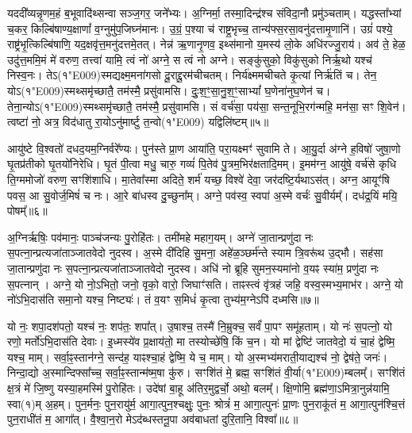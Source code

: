 यददी᳚व्यन्नृ॒णम॒हं ब॒भूवादि॑थ्सन्वा सञ्ज॒गर॒ जने᳚भ्यः। 
अ॒ग्निर्मा॒ तस्मा॒दिन्द्र॑श्च संविदा॒नौ प्रमु॑ञ्चताम्। 
यद्धस्ता᳚भ्यां च॒कर॒ किल्बि॑षाण्य॒क्षाणां᳚ व॒ग्नुमु॑प॒जिघ्न॑मानः। 
उ॒ग्रं॒ प॒श्या च॑ राष्ट्र॒भृच्च॒ तान्य॑फ्स॒रसा॒वनु॑दत्तामृ॒णानि॑। 
उग्रं॑ पश्ये॒ राष्ट्र॑भृ॒त्किल्बि॑षाणि॒ यद॒क्षवृ॑त्त॒मनु॑दत्तमे॒तत्। 
नेन्न॑ ऋ॒णानृ॒णव॒ इथ्स॑मानो य॒मस्य॑ लो॒के अधि॑रज्जु॒राय॑। 
अव॑ ते॒ हेळ॒ उदु॑त्त॒ममि॒मं मे॑ वरुण॒ तत्त्वा॑ यामि॒ त्वं नो॑ अग्ने॒ स त्वं नो अग्ने। 
सङ्कु॑सुको॒ विकु॑सुको निर्\mbox{}ऋ॒थो यश्च॑ निस्व॒नः। 
तेऽ(१\char"E009)स्मद्यक्ष्म॒मना॑गसो दू॒राद्दू॒रम॑चीचतम्। 
निर्य॑क्ष्ममचीचते कृ॒त्यां निर्\mbox{}ऋ॑तिं च। 
तेन॒ योऽ(१\char"E009)स्मथ्समृ॑च्छातै॒ तम॑स्मै॒ प्रसु॑वामसि। 
दुः॒श॒ꣳ॒सा॒नु॒श॒ꣳ॒साभ्यां᳚ घ॒णेना॑नुघ॒णेन॑ च। 
तेना॒न्योऽ(१\char"E009)स्मथ्समृ॑च्छातै॒ तम॑स्मै॒ प्रसु॑वामसि। 
सं वर्च॑सा॒ पय॑सा॒ सन्त॒नूभि॒रग॑न्महि॒ मन॑सा॒ सꣳ शि॒वेन॑। 
त्वष्टा॑ नो॒ अत्र॒ विद॑धातु रा॒योऽनु॑मार्ष्टु त॒न्वो(१\char"E009) यद्विलि॑ष्टम्॥५॥\anuvakamend


आयु॑ष्टे वि॒श्वतो॑ दधद॒यम॒ग्निर्वरे᳚ण्यः। 
पुन॑स्ते प्रा॒ण आया॑ति॒ परा॒यक्ष्मꣳ॑ सुवामि ते। 
आ॒यु॒र्दा अ॑ग्ने ह॒विषो॑ जुषा॒णो घृ॒तप्र॑तीको घृ॒तयो॑निरेधि। 
घृ॒तं पी॒त्वा मधु॒ चारु॒ गव्यं॑ पि॒तेव॑ पु॒त्रम॒भिर॑क्षतादि॒मम्। 
इ॒मम॑ग्न॒ आयु॑षे॒ वर्च॑से कृधि ति॒ग्ममोजो॑ वरुण॒ सꣳशि॑शाधि। 
मा॒तेवा᳚स्मा अदिते॒ शर्म॑ यच्छ॒ विश्वे॑ देवा॒ जर॑दष्टि॒र्यथाऽस॑त्। 
अग्न॒ आयूꣳ॑षि पवस॒ आ सु॒वोर्ज॒मिषं॑ च नः। 
आ॒रे बा॑धस्व दु॒च्छुना᳚म्। 
अग्ने॒ पव॑स्व॒ स्वपा॑ अ॒स्मे वर्चः॑ सु॒वीर्यम्᳚। 
दध॑द्र॒यिं मयि॒ पोषम्᳚॥६॥

अ॒ग्निर्\mbox{}ऋषिः॒ पव॑मानः॒ पाञ्च॑जन्यः पु॒रोहि॑तः। 
तमी॑महे महाग॒यम्। 
अग्ने॑ जा॒तान्प्रणु॑दा नः स॒पत्ना॒न्प्रत्यजा॑ताञ्जातवेदो नुदस्व। 
अ॒स्मे दी॑दिहि सु॒मना॒ अहे॑ळ॒ञ्छर्म॑न्ते स्याम त्रि॒वरू॑थ उ॒द्भौ। 
सह॑सा जा॒तान्प्रणु॑दा नः स॒पत्ना॒न्प्रत्यजा॑ताञ्जातवेदो नुदस्व। 
अधि॑ नो ब्रूहि सुमन॒स्यमा॑नो व॒यꣴ स्या॑म॒ प्रणु॑दा नः स॒पत्नान्। 
अग्ने॒ यो नो॒ऽभितो॒ जनो॒ वृको॒ वारो॒ जिघाꣳ॑सति। 
ताꣴस्त्वं वृ॑त्रहं जहि॒ वस्व॒स्मभ्य॒माभ॑र। 
अग्ने॒ यो नो॑ऽभि॒दास॑ति समा॒नो यश्च॒ निष्ट्यः॑। 
तं व॒यꣳ स॒मिधं॑ कृ॒त्वा तुभ्य॑म॒ग्नेऽपि॑ दध्मसि॥७॥

यो नः॒ शपा॒दश॑पतो॒ यश्च॑ नः॒ शप॑तः॒ शपा᳚त्। 
उ॒षाश्च॒ तस्मै॑ नि॒म्रुक्च॒ सर्वं॑ पा॒पꣳ समू॑हताम्। 
यो नः॑ स॒पत्नो॒ यो रणो॒ मर्तो॑ऽभि॒दास॑ति देवाः। 
इ॒ध्मस्ये॑व प्र॒क्षाय॑तो॒ मा तस्योच्छे॑षि॒ किं च॒न। 
यो मां द्वेष्टि॑ जातवेदो॒ यं चा॒हं द्वेष्मि॒ यश्च॒ माम्। 
सर्वा॒ꣴ॒स्तान॑ग्ने॒ सन्द॑ह॒ याꣴश्चा॒हं द्वेष्मि॒ ये च॒ माम्। 
यो अ॒स्मभ्य॑मराती॒याद्यश्च॑ नो॒ द्वेष॑ते॒ जनः॑। 
निन्दा॒द्यो अ॒स्मान्दिफ्सा᳚च्च॒ सर्वा॒ꣴ॒स्तान्म॑ष्म॒षा कु॑रु। 
सꣳशि॑तं मे॒ ब्रह्म॒ सꣳशि॑तं वी॒र्या(१\char"E009)म्बलम्᳚। 
सꣳशि॑तं क्ष॒त्रं मे॑ जि॒ष्णु यस्या॒हमस्मि॑ पु॒रोहि॑तः। 
उदे॑षां बा॒हू अ॑तिर॒मुद्वर्चो॒ अथो॒ बलम्᳚। 
क्षि॒णोमि॒ ब्रह्म॑णा॒ऽमित्रा॒नुन्न॑यामि॒ स्वा(१)म् अ॒हम्। 
पुन॒र्मनः॒ पुन॒रायु॑र्म॒ आगा॒त्पुन॒श्चक्षुः॒ पुनः॒ श्रोत्रं॑ म॒ आगा॒त्पुनः॑ प्रा॒णः पुन॒राकू॑तं म॒ आगा॒त्पुन॑श्चि॒त्तं पुन॒राधी॑तं म॒ आगा᳚त्। 
वै॒श्वा॒न॒रो मेऽद॑ब्धस्तनू॒पा अव॑बाधतां दुरि॒तानि॒ विश्वा᳚॥८॥\anuvakamend

